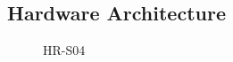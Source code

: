 \documentclass[times, 1pt, a4paper]{article}
\begin{document}
\subsection{Hardware Architecture} \label{subsection:hardware_architecture}

 \begin{figure}[h] 
	\centering
	\centering
	\caption{HR-S04}
	\label{fig:hr_s04}
	\end{figure}
\end{document}

